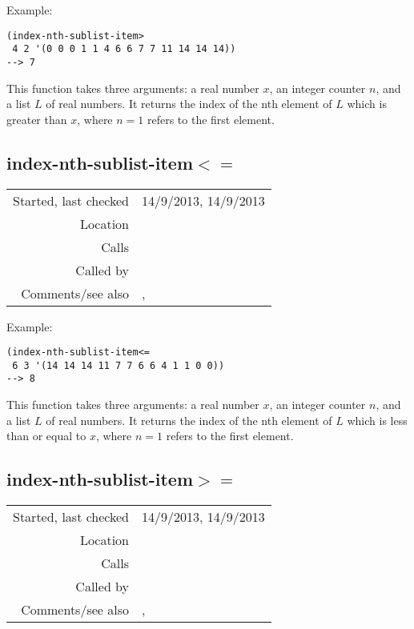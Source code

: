 \vspace{0.5cm}
\noindent Example:
\begin{verbatim}
(index-nth-sublist-item>
 4 2 '(0 0 0 1 1 4 6 6 7 7 11 14 14 14))
--> 7
\end{verbatim}

\noindent This function takes three arguments: a real
number $x$, an integer counter $n$, and a list $L$ of
real numbers. It returns the index of the nth element
of $L$ which is greater than $x$, where $n = 1$ refers
to the first element.


\subsection*{index-nth-sublist-item$<=$}\label{fun:index-nth-sublist-item<=}

\vspace{0.3cm}
\begin{tabular}{r|p{8cm}}
Started, last checked & 14/9/2013, 14/9/2013 \\
Location & \nameref{sec:locating-indices} \\
Calls & \\
Called by & \\
Comments/see also & \nameref{fun:index-1st-sublist-item<=}, \newline \nameref{fun:index-nth-sublist-item<}
\end{tabular}

\vspace{0.5cm}
\noindent Example:
\begin{verbatim}
(index-nth-sublist-item<=
 6 3 '(14 14 14 11 7 7 6 6 4 1 1 0 0))
--> 8
\end{verbatim}

\noindent This function takes three arguments: a real
number $x$, an integer counter $n$, and a list $L$ of
real numbers. It returns the index of the nth element
of $L$ which is less than or equal to $x$, where
$n = 1$ refers to the first element.


\subsection*{index-nth-sublist-item$>=$}\label{fun:index-nth-sublist-item>=}

\vspace{0.3cm}
\begin{tabular}{r|p{8cm}}
Started, last checked & 14/9/2013, 14/9/2013 \\
Location & \nameref{sec:locating-indices} \\
Calls & \\
Called by & \\
Comments/see also & \nameref{fun:index-1st-sublist-item>=}, \newline \nameref{fun:index-nth-sublist-item>}
\end{tabular}

